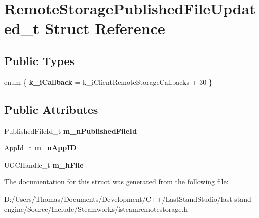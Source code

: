 \hypertarget{structRemoteStoragePublishedFileUpdated__t}{}\section{Remote\+Storage\+Published\+File\+Updated\+\_\+t Struct Reference}
\label{structRemoteStoragePublishedFileUpdated__t}
\subsection*{Public Types}
\begin{DoxyCompactItemize}
\item 
\hypertarget{structRemoteStoragePublishedFileUpdated__t_a52a32ddd51a46d2a825ba470664020f1}{}enum \{ {\bfseries k\+\_\+i\+Callback} = k\+\_\+i\+Client\+Remote\+Storage\+Callbacks + 30
 \}\label{structRemoteStoragePublishedFileUpdated__t_a52a32ddd51a46d2a825ba470664020f1}

\end{DoxyCompactItemize}
\subsection*{Public Attributes}
\begin{DoxyCompactItemize}
\item 
\hypertarget{structRemoteStoragePublishedFileUpdated__t_acd376f5fa18f81c1a2719129d64f27b8}{}Published\+File\+Id\+\_\+t {\bfseries m\+\_\+n\+Published\+File\+Id}\label{structRemoteStoragePublishedFileUpdated__t_acd376f5fa18f81c1a2719129d64f27b8}

\item 
\hypertarget{structRemoteStoragePublishedFileUpdated__t_a212aae00a00b66cb761fbc3add74f133}{}App\+Id\+\_\+t {\bfseries m\+\_\+n\+App\+I\+D}\label{structRemoteStoragePublishedFileUpdated__t_a212aae00a00b66cb761fbc3add74f133}

\item 
\hypertarget{structRemoteStoragePublishedFileUpdated__t_a0c029cd00bcbdf005f78628c3d41f00b}{}U\+G\+C\+Handle\+\_\+t {\bfseries m\+\_\+h\+File}\label{structRemoteStoragePublishedFileUpdated__t_a0c029cd00bcbdf005f78628c3d41f00b}

\end{DoxyCompactItemize}


The documentation for this struct was generated from the following file\+:\begin{DoxyCompactItemize}
\item 
D\+:/\+Users/\+Thomas/\+Documents/\+Development/\+C++/\+Last\+Stand\+Studio/last-\/stand-\/engine/\+Source/\+Include/\+Steamworks/isteamremotestorage.\+h\end{DoxyCompactItemize}
